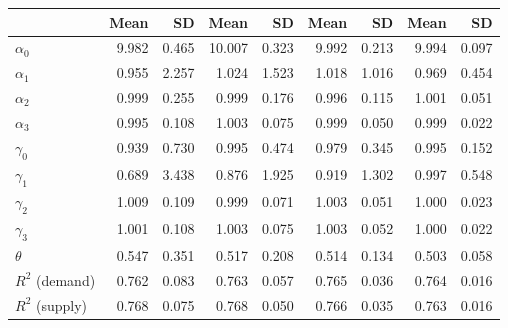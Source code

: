 
\begin{tabular}[t]{lrrrrrrrr}
\toprule
  & Mean & SD & Mean  & SD  & Mean   & SD   & Mean    & SD   \\
\midrule
$\alpha_{0}$ & 9.982 & 0.465 & 10.007 & 0.323 & 9.992 & 0.213 & 9.994 & 0.097\\
$\alpha_{1}$ & 0.955 & 2.257 & 1.024 & 1.523 & 1.018 & 1.016 & 0.969 & 0.454\\
$\alpha_{2}$ & 0.999 & 0.255 & 0.999 & 0.176 & 0.996 & 0.115 & 1.001 & 0.051\\
$\alpha_{3}$ & 0.995 & 0.108 & 1.003 & 0.075 & 0.999 & 0.050 & 0.999 & 0.022\\
$\gamma_{0}$ & 0.939 & 0.730 & 0.995 & 0.474 & 0.979 & 0.345 & 0.995 & 0.152\\
$\gamma_{1}$ & 0.689 & 3.438 & 0.876 & 1.925 & 0.919 & 1.302 & 0.997 & 0.548\\
$\gamma_{2}$ & 1.009 & 0.109 & 0.999 & 0.071 & 1.003 & 0.051 & 1.000 & 0.023\\
$\gamma_{3}$ & 1.001 & 0.108 & 1.003 & 0.075 & 1.003 & 0.052 & 1.000 & 0.022\\
$\theta$ & 0.547 & 0.351 & 0.517 & 0.208 & 0.514 & 0.134 & 0.503 & 0.058\\
$R^{2}$ (demand) & 0.762 & 0.083 & 0.763 & 0.057 & 0.765 & 0.036 & 0.764 & 0.016\\
$R^{2}$ (supply) & 0.768 & 0.075 & 0.768 & 0.050 & 0.766 & 0.035 & 0.763 & 0.016\\
\bottomrule
\end{tabular}
